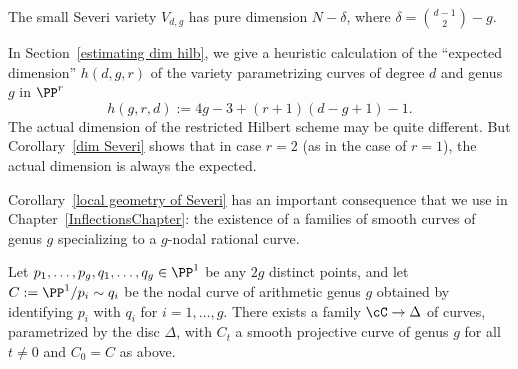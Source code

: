\begin{corollary}\label{dim Severi}
The small Severi variety $V_{d,g}$ has pure dimension $N - \delta$, where $\delta = \binom{d-1}{2} - g$.
\end{corollary}

In Section~\ref{estimating dim hilb}, we give a heuristic calculation of the ``expected dimension'' $h(d,g,r)$ of the variety parametrizing curves of degree $d$ and genus $g$ in $\PP^r$
$$
h(g,r,d) := 4g-3 + (r+1)(d-g+1) - 1.
$$
The actual dimension of the restricted Hilbert scheme may be quite different. But  Corollary~\ref{dim Severi} shows that in case $r=2$ (as in the case of $r=1$), the actual dimension is always the expected.

Corollary~\ref{local geometry of Severi} has an important consequence that we use in Chapter~\ref{InflectionsChapter}: the existence of a families of smooth curves of genus $g$ specializing to a $g$-nodal rational curve. 

%

\begin{corollary}\label{smoothing nodes}
Let $p_1, \dots, p_g, q_1, \dots, q_g \in \PP^1$ be any $2g$ distinct points, and let $C := \PP^1/p_i \sim q_i$ be the nodal curve of arithmetic genus $g$ obtained by identifying $p_i$ with $q_i$ for $i = 1,\dots,g$. There exists a family $\cC \to  \Delta $ of curves, parametrized by the disc $\Delta$, with $C_t$ a smooth projective curve of genus $g$ for all $t \neq 0$ and $C_0 = C$ as above.
\end{corollary}

